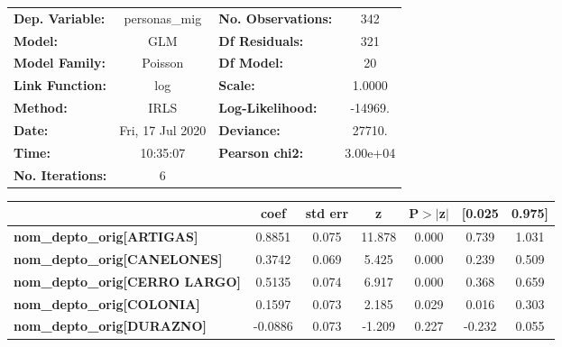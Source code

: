 \begin{center}
\begin{tabular}{lclc}
\toprule
\textbf{Dep. Variable:}                   &  personas\_mig   & \textbf{  No. Observations:  } &      342    \\
\textbf{Model:}                           &       GLM        & \textbf{  Df Residuals:      } &      321    \\
\textbf{Model Family:}                    &     Poisson      & \textbf{  Df Model:          } &       20    \\
\textbf{Link Function:}                   &       log        & \textbf{  Scale:             } &    1.0000   \\
\textbf{Method:}                          &       IRLS       & \textbf{  Log-Likelihood:    } &   -14969.   \\
\textbf{Date:}                            & Fri, 17 Jul 2020 & \textbf{  Deviance:          } &    27710.   \\
\textbf{Time:}                            &     10:35:07     & \textbf{  Pearson chi2:      } &  3.00e+04   \\
\textbf{No. Iterations:}                  &        6         & \textbf{                     } &             \\
\bottomrule
\end{tabular}
\begin{tabular}{lcccccc}
                                          & \textbf{coef} & \textbf{std err} & \textbf{z} & \textbf{P$> |$z$|$} & \textbf{[0.025} & \textbf{0.975]}  \\
\midrule
\textbf{nom\_depto\_orig[ARTIGAS]}        &       0.8851  &        0.075     &    11.878  &         0.000        &        0.739    &        1.031     \\
\textbf{nom\_depto\_orig[CANELONES]}      &       0.3742  &        0.069     &     5.425  &         0.000        &        0.239    &        0.509     \\
\textbf{nom\_depto\_orig[CERRO LARGO]}    &       0.5135  &        0.074     &     6.917  &         0.000        &        0.368    &        0.659     \\
\textbf{nom\_depto\_orig[COLONIA]}        &       0.1597  &        0.073     &     2.185  &         0.029        &        0.016    &        0.303     \\
\textbf{nom\_depto\_orig[DURAZNO]}        &      -0.0886  &        0.073     &    -1.209  &         0.227        &       -0.232    &        0.055     \\

\end{tabular}
\end{center}
